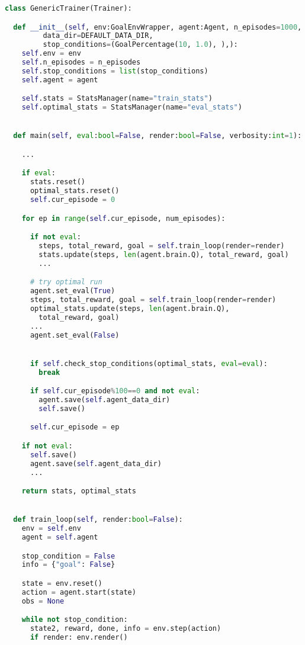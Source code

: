 \begin{lstlisting}[style=Python, language=Python, escapechar=£, label={code:trainer}, caption={The \texttt{Trainer} that implements the training loop.}]
class GenericTrainer(Trainer):

  def __init__(self, env:GoalEnvWrapper, agent:Agent, n_episodes=1000,
         data_dir=DEFAULT_DATA_DIR,
         stop_conditions=(GoalPercentage(10, 1.0), ),):
    self.env = env
    self.n_episodes = n_episodes
    self.stop_conditions = list(stop_conditions)
    self.agent = agent

    self.stats = StatsManager(name="train_stats")
    self.optimal_stats = StatsManager(name="eval_stats")


  def main(self, eval:bool=False, render:bool=False, verbosity:int=1):

    ...

    if eval:
      stats.reset()
      optimal_stats.reset()
      self.cur_episode = 0

    for ep in range(self.cur_episode, num_episodes):

      if not eval:
        steps, total_reward, goal = self.train_loop(render=render)
        stats.update(steps, len(agent.brain.Q), total_reward, goal)
        ...

      # try optimal run
      agent.set_eval(True)
      steps, total_reward, goal = self.train_loop(render=render)
      optimal_stats.update(steps, len(agent.brain.Q),
        total_reward, goal)
      ...
      agent.set_eval(False)


      if self.check_stop_conditions(optimal_stats, eval=eval):
        break

      if self.cur_episode%100==0 and not eval:
        agent.save(self.agent_data_dir)
        self.save()

      self.cur_episode = ep

    if not eval:
      self.save()
      agent.save(self.agent_data_dir)
      ...

    return stats, optimal_stats


  def train_loop(self, render:bool=False):
    env = self.env
    agent = self.agent

    stop_condition = False
    info = {"goal": False}

    state = env.reset()
    action = agent.start(state)
    obs = None

    while not stop_condition:
      state2, reward, done, info = env.step(action)
      if render: env.render()


\end{lstlisting}
